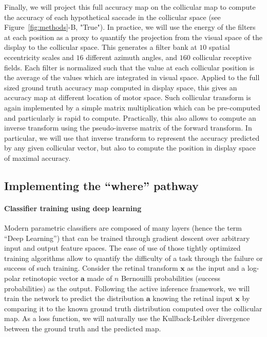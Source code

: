 Finally, we will project this full accuracy map on the collicular map to compute the accuracy of each hypothetical saccade in the collicular space (see  Figure~\ref{fig:methods}-B, "True"). In practice, we will use the energy of the filters at each position as a proxy to quantify the projection from the visual space of the display to the collicular space. This generates a filter bank at $10$ spatial eccentricity scales and $16$ different azimuth angles, and $160$ collicular receptive fields. Each filter is normalized such that the value at each collicular position is the average of the values which are integrated in visual space. Applied to the full sized ground truth accuracy map computed in display space, this gives an accuracy map at different location of motor space. Such collicular transform is again implemented by a simple matrix multiplication which can be pre-computed and particularly is rapid to compute. Practically, this also allows to compute an inverse transform using the pseudo-inverse matrix of the forward transform. In particular, we will use that inverse transform to represent the accuracy predicted by any given collicular vector, but also to compute the position in display space of maximal accuracy.

\subsection{Implementing the ``where'' pathway}


\paragraph{Classifier training using deep learning}
Modern parametric classifiers are composed of many layers (hence the term ``Deep Learning'') that can be trained through gradient descent over arbitrary input and output feature spaces. The ease of use of those tightly optimized training algorithms allow to quantify the difficulty of a task through the failure or success of such training. Consider the retinal transform $\boldsymbol{x}$ as the input and a log-polar retinotopic vector $\boldsymbol{a}$ made of $n$ Bernouilli probabilities (success probabilities) as the output. Following the active inference framework, we will train the network to predict the distribution $\boldsymbol{a}$ knowing the retinal input $\boldsymbol{x}$ by comparing it to the known ground truth distribution computed over the collicular map. As a loss function, we will naturally use the Kullback-Leibler divergence between the ground truth and the predicted map.

